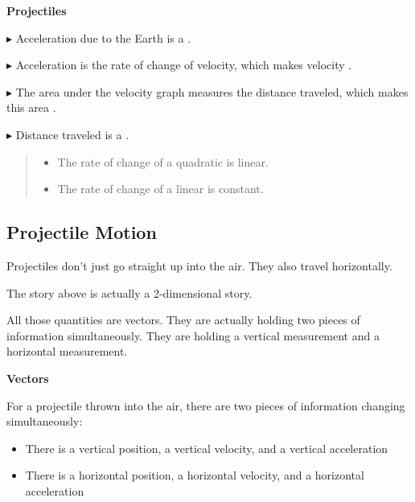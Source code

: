 \documentclass{ximera}
\begin{document}
\begin{summary} \textbf{\textcolor{red!70!yellow}{Projectiles}}



$\blacktriangleright$ Acceleration due to the Earth is a . 

$\blacktriangleright$ Acceleration is the rate of change of velocity, which makes velocity . 

$\blacktriangleright$ The area under the velocity graph measures the distance traveled, which makes this area . 

$\blacktriangleright$ Distance traveled is a . 




\begin{quote}
\begin{itemize}
\item The rate of change of a quadratic is linear.
\item The rate of change of a linear is constant.
\end{itemize}
\end{quote}



\end{summary}








\subsection*{Projectile Motion}


Projectiles don't just go straight up into the air.  They also travel horizontally.

The story above is actually a 2-dimensional story.

All those quantities are vectors.  They are actually holding two pieces of information simultaneously. They are holding a vertical measurement and a horizontal measurement. 

\begin{observation} \textbf{\textcolor{-red!75}{Vectors}}


For a projectile thrown into the air, there are two pieces of information changing simultaneously:

\begin{itemize}
\item There is a vertical position, a vertical velocity, and a vertical acceleration
\item There is a horizontal position, a horizontal velocity, and a horizontal acceleration
\end{itemize}
\end{observation}
\end{document}
